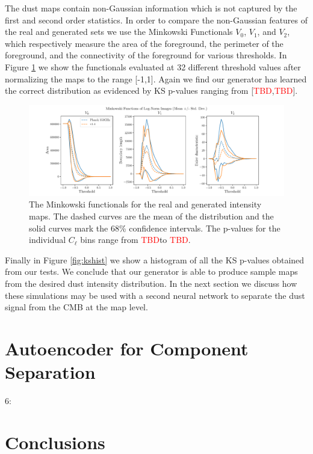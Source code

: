\documentclass[twocolumn]{aastex62}
\def\tbd{\textcolor{red}{TBD}}
\begin{document}
The dust maps contain non-Gaussian information which is not captured by the first and second order statistics. In order to compare the non-Gaussian features of the real and generated sets we use the Minkowski Functionals $V_0$, $V_1$, and $V_2$, which respectively measure the area of the foreground, the perimeter of the foreground, and the connectivity of the foreground for various thresholds.  In Figure \ref{fig:mink} we show the functionals evaluated at 32 different threshold values after normalizing the maps to the range [-1,1]. Again we find our generator has learned the correct distribution as evidenced by KS p-values ranging from [\tbd,\tbd]. 

\begin{figure}[!tbh]
\includegraphics[width = \textwidth]{MinkowskiFunctionals.pdf}
\caption{The Minkowski functionals for the real and generated intensity maps. The dashed curves are the mean of the distribution and the solid curves mark the 68\% confidence intervals. The p-values for the individual $C_{\ell}$ bins range from \tbd to \tbd.}
\label{fig:mink}
\end{figure}

 Finally in Figure \ref{fig:kshist} we show a histogram of all the KS p-values obtained from our tests. We conclude that our generator is able to produce sample maps from the desired dust intensity distribution. In the next section we discuss how these simulations may be used with a second neural network to separate the dust signal from the CMB at the map level.
 
 



\section{Autoencoder for Component Separation}

6:

\section{Conclusions}


\end{document}
